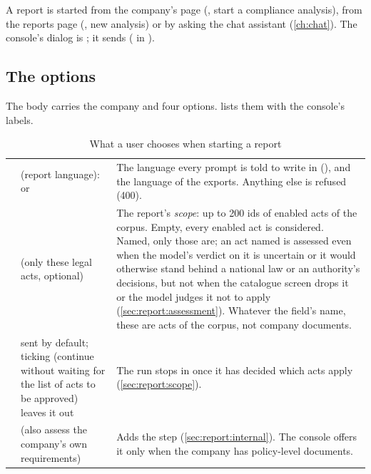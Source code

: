 A report is started from the company's page (, start a
compliance analysis), from the reports page (, new analysis) or by asking
the chat assistant (\cref{ch:chat}). The console's dialog is ;
it sends  ( in ).

\subsection{The options}

The body carries the company and four options.  lists them with the
console's labels.

\begin{table}[H]
\caption{What a user chooses when starting a report}\label{tab:report:options}
\begin{tabularx}{\textwidth}{@{}L{25mm}L{48mm}Y@{}}
\toprule
{} &  &  \\
\midrule
{} &  (report language):  or  & The language every prompt is told to write in (), and the language of the exports. Anything else is refused (400). \\
 &  (only these legal acts, optional) & The report's \emph{scope}: up to 200 ids of enabled acts of the corpus. Empty, every enabled act is considered. Named, only those are; an act named is assessed even when the model's verdict on it is uncertain or it would otherwise stand behind a national law or an authority's decisions, but not when the catalogue screen drops it or the model judges it not to apply (\cref{sec:report:assessment}). Whatever the field's name, these are acts of the corpus, not company documents. \\
 & sent by default; ticking  (continue without waiting for the list of acts to be approved) leaves it out & The run stops in  once it has decided which acts apply (\cref{sec:report:scope}). \\
 &  (also assess the company's own requirements) & Adds the step  (\cref{sec:report:internal}). The console offers it only when the company has policy-level documents. \\
\bottomrule
\end{tabularx}
\end{table}

